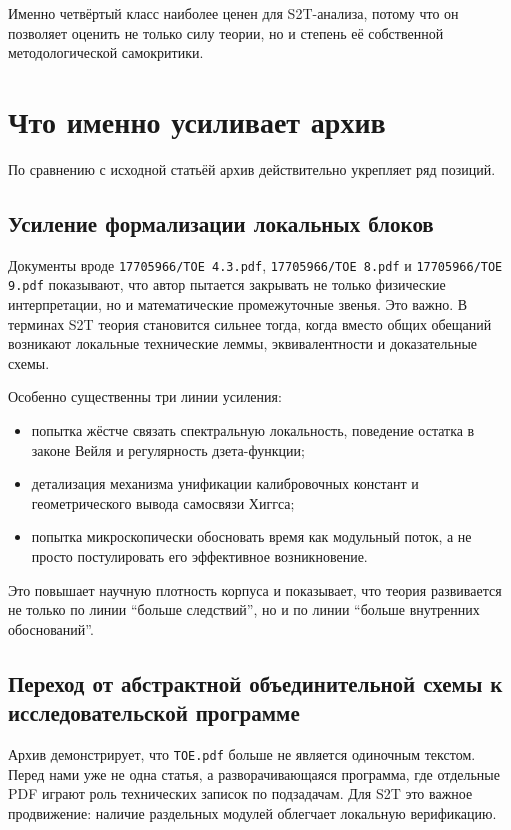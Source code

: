 \documentclass[12pt,a4paper]{article}
\begin{document}
Именно четвёртый класс наиболее ценен для S2T-анализа, потому что он позволяет оценить не только силу теории, но и степень её собственной методологической самокритики.

\section{Что именно усиливает архив}

По сравнению с исходной статьёй архив действительно укрепляет ряд позиций.

\subsection{Усиление формализации локальных блоков}

Документы вроде \texttt{17705966/ТОЕ 4.3.pdf}, \texttt{17705966/ТОЕ 8.pdf} и \texttt{17705966/ТОЕ 9.pdf} показывают, что автор пытается закрывать не только физические интерпретации, но и математические промежуточные звенья. Это важно. В терминах S2T теория становится сильнее тогда, когда вместо общих обещаний возникают локальные технические леммы, эквивалентности и доказательные схемы.

Особенно существенны три линии усиления:
\begin{itemize}
    \item попытка жёстче связать спектральную локальность, поведение остатка в законе Вейля и регулярность дзета-функции;
    \item детализация механизма унификации калибровочных констант и геометрического вывода самосвязи Хиггса;
    \item попытка микроскопически обосновать время как модульный поток, а не просто постулировать его эффективное возникновение.
\end{itemize}

Это повышает научную плотность корпуса и показывает, что теория развивается не только по линии ``больше следствий'', но и по линии ``больше внутренних обоснований''.

\subsection{Переход от абстрактной объединительной схемы к исследовательской программе}

Архив демонстрирует, что \texttt{TOE.pdf} больше не является одиночным текстом. Перед нами уже не одна статья, а разворачивающаяся программа, где отдельные PDF играют роль технических записок по подзадачам. Для S2T это важное продвижение: наличие раздельных модулей облегчает локальную верификацию.
\end{document}
